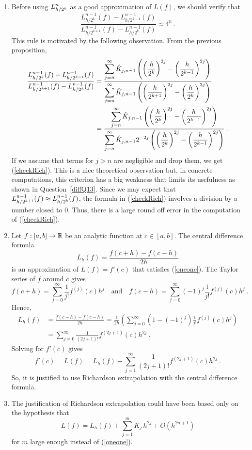 \begin{rmkList}
\begin{enumerate}
\item Before using $\displaystyle L_{h/2^k}^n$ as a good approximation
of $L(f)$, we should verify that
\begin{equation} \label{checkRich}
\frac{L_{h/2^k}^{n-1}(f) -L_{h/2^{k-1}}^{n-1}(f)}
{L_{h/2^{k+1}}^{n-1}(f) -L_{h/2^k}^{n-1}(f)} \approx 4^n \ .
\end{equation}
This rule is motivated by the following observation.  From the previous
proposition,
\begin{align*}
\frac{\displaystyle L_{h/2^k}^{n-1}(f) -L_{h/2^{k-1}}^{n-1}(f)}
{\displaystyle L_{h/2^{k+1}}^{n-1}(f) -L_{h/2^k}^{n-1}(f)}
&= \frac{\displaystyle \sum_{j=n}^\infty \hat{K}_{j,n-1}
\left( \left(\frac{h}{2^k}\right)^{2j} -
\left(\frac{h}{2^{k-1}}\right)^{2j} \right)}
{\displaystyle \sum_{j=n}^\infty \hat{K}_{j,n-1}
\left( \left(\frac{h}{2^{k+1}}\right)^{2j} -
 \left(\frac{h}{2^k}\right)^{2j} \right)} \\
&= \frac{\displaystyle \sum_{j=n}^\infty \hat{K}_{j,n-1}
\left( \left(\frac{h}{2^k}\right)^{2j} -
\left(\frac{h}{2^{k-1}}\right)^{2j}\right)}
{\displaystyle \sum_{j=n}^\infty \hat{K}_{j,n-1} 2^{-2j}
\left( \left(\frac{h}{2^k}\right)^{2j} -
\left(\frac{h}{2^{k-1}}\right)^{2j}\right)} \ .
\end{align*}
If we assume that terms for $j>n$ are negligible and drop them, we get
(\ref{checkRich}).  This is a nice theoretical observation but, in
concrete computations, this criterion has a big weakness that limits
its usefulness as shown in Question~\ref{diffQ13}.
Since we may expect that
$\displaystyle L_{h/2^{k+1}}^{n-1}(f) \approx L_{h/2^k}^{n-1}(f)$,
the formula in (\ref{checkRich}) involves a division by a number
closed to $0$.  Thus, there is a large round off error in the
computation of (\ref{checkRich}).

\item Let $f:[a,b] \rightarrow \mathbb{R}$ be an analytic function at
$c \in [a,b]$.  The central difference formula
\[
L_h(f) = \frac{f(c+h) - f(c-h)}{2h}
\]
is an approximation of $L(f) = f'(c)$ that satisfies
(\ref{oneone}).  The Taylor series of $f$ around $c$ gives
\[
f(c+h) = \sum_{j=0}^\infty \frac{1}{j!} f^{(j)}(c)h^j
\quad \text{and} \quad
f(c-h) = \sum_{j=0}^\infty (-1)^j\frac{1}{j!} f^{(j)}(c)h^j \ .
\]
Hence,
\begin{align*}
L_h(f) &= \frac{f(c+h) - f(c-h)}{2h} = \frac{1}{2h} \left(
\sum_{j=0}^\infty \left(1 - (-1)^j \right)\frac{1}{j!} f^{(j)}(c)h^j \right) \\
&= \sum_{j=0}^\infty \frac{1}{(2j+1)!} f^{(2j+1)}(c)h^{2j} \ .
\end{align*}
Solving for $f'(c)$ gives
\[
f'(c) = L(f) = L_h(f) - \sum_{j=1}^\infty \frac{1}{(2j+1)!}
f^{(2j+1)}(c)h^{2j}\ .
\]
So, it is justified to use Richardson extrapolation with the central
difference formula.
\item The justification of Richardson extrapolation could have been
based only on the hypothesis that
\[
L(f) = L_h(f) + \sum_{j=1}^m K_j\,h^{2j} + O(h^{2n+1})
\]
for $m$ large enough instead of (\ref{oneone}).
\end{enumerate}
\end{rmkList}

